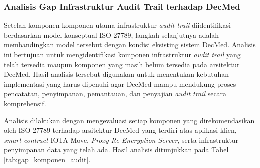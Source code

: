 \subsubsection{Analisis Gap Infrastruktur Audit Trail terhadap DecMed}

Setelah komponen-komponen utama infrastruktur \textit{audit trail} diidentifikasi berdasarkan model konseptual ISO 27789, langkah selanjutnya adalah membandingkan model tersebut dengan kondisi eksisting sistem DecMed. Analisis ini bertujuan untuk mengidentifikasi komponen infrastruktur \textit{audit trail} yang telah tersedia maupun komponen yang masih belum tersedia pada arsitektur DecMed. Hasil analisis tersebut digunakan untuk menentukan kebutuhan implementasi yang harus dipenuhi agar DecMed mampu mendukung proses pencatatan, penyimpanan, pemantauan, dan penyajian \textit{audit trail} secara komprehensif.

Analisis dilakukan dengan mengevaluasi setiap komponen yang direkomendasikan oleh ISO 27789 terhadap arsitektur DecMed yang terdiri atas aplikasi klien, \textit{smart contract} IOTA Move, \textit{Proxy Re-Encryption Server}, serta infrastruktur penyimpanan data yang telah ada. Hasil analisis ditunjukkan pada Tabel \ref{tab:gap_komponen_audit}.

